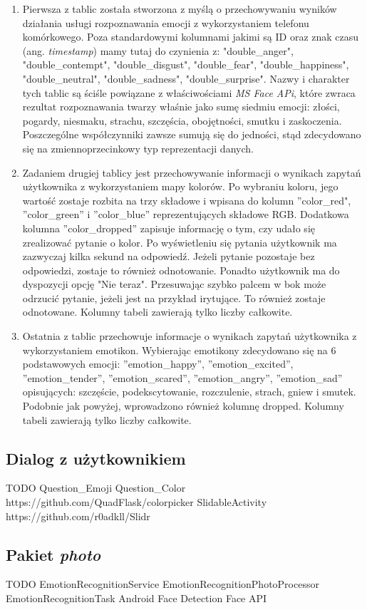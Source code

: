 \begin{enumerate}
	\item Pierwsza z tablic została stworzona z myślą o przechowywaniu wyników działania usługi rozpoznawania emocji z wykorzystaniem telefonu komórkowego. Poza standardowymi kolumnami jakimi są ID oraz znak czasu (ang. \textit{timestamp}) mamy tutaj do czynienia z: "double\_anger", "double\_contempt", "double\_disgust", "double\_fear", "double\_happiness", "double\_neutral", "double\_sadness", "double\_surprise". Nazwy i charakter tych tablic są ściśle powiązane z właściwościami \textit{MS Face APi}, które zwraca rezultat rozpoznawania twarzy właśnie jako sumę siedmiu emocji: złości, pogardy, niesmaku, strachu, szczęścia, obojętności, smutku i zaskoczenia. Poszczególne współczynniki zawsze sumują się do jedności, stąd zdecydowano się na zmiennoprzecinkowy typ reprezentacji danych.
	
	\item Zadaniem drugiej tablicy jest przechowywanie informacji o wynikach zapytań użytkownika z wykorzystaniem mapy kolorów. Po wybraniu koloru, jego wartość zostaje rozbita na trzy składowe i wpisana do kolumn ''color\_red", ''color\_green'' i ''color\_blue'' reprezentujących składowe RGB. Dodatkowa kolumna ''color\_dropped'' zapisuje informację o tym, czy udało się zrealizować pytanie o kolor. Po wyświetleniu się pytania użytkownik ma zazwyczaj kilka sekund na odpowiedź. Jeżeli pytanie pozostaje bez odpowiedzi, zostaje to również odnotowanie. Ponadto użytkownik ma do dyspozycji opcję "Nie teraz". Przesuwając szybko palcem w bok może odrzucić pytanie, jeżeli jest na przykład irytujące. To również zostaje odnotowane. Kolumny tabeli zawierają tylko liczby całkowite.
	
	\item Ostatnia z tablic przechowuje informacje o wynikach zapytań użytkownika z wykorzystaniem emotikon. Wybierając emotikony zdecydowano się na 6 podstawowych emocji: ''emotion\_happy'', ''emotion\_excited'', ''emotion\_tender'', ''emotion\_scared'', ''emotion\_angry'', ''emotion\_sad'' opisujących: szczęście, podekscytowanie, rozczulenie, strach, gniew i smutek. Podobnie jak powyżej, wprowadzono również kolumnę dropped. Kolumny tabeli zawierają tylko liczby całkowite.
\end{enumerate}


\subsection{Dialog z użytkownikiem}

TODO
Question\_Emoji
Question\_Color
https://github.com/QuadFlask/colorpicker
SlidableActivity https://github.com/r0adkll/Slidr


\subsection{Pakiet \textit{photo}}

TODO
EmotionRecognitionService
EmotionRecognitionPhotoProcessor
EmotionRecognitionTask
Android Face Detection
Face API



